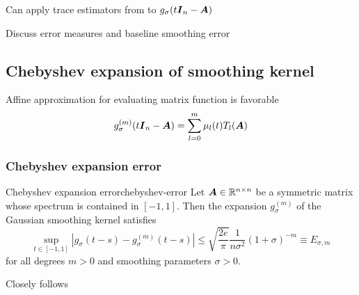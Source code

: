 \documentclass[12pt]{article}
\begin{document}
Can apply trace estimators from  to $g_{\sigma}(t\boldsymbol{I}_n - \boldsymbol{A})$

Discuss error measures and baseline smoothing error 

\subsection{Chebyshev expansion of smoothing kernel}
\label{subsec:chebyshev-expansion}

Affine approximation for evaluating matrix function is favorable
\begin{equation}
    g_{\sigma}^{(m)}(t\boldsymbol{I}_n - \boldsymbol{A}) = \sum_{l=0}^{m} \mu_l(t) T_l(\boldsymbol{A})
    \label{equ:matrix-expansion}
\end{equation}

\subsubsection{Chebyshev expansion error}
\label{subsubsec:expansion-error}

\begin{lemma}{Chebyshev expansion error}{chebyshev-error}
    Let $\boldsymbol{A} \in \mathbb{R}^{n \times n}$ be a symmetric matrix whose spectrum is contained in $[-1, 1]$. Then the expansion $g_{\sigma}^{(m)}$ of the Gaussian smoothing kernel satisfies
    \begin{equation}
        \sup_{t \in [-1, 1]} \left| g_{\sigma}(t - s) - g_{\sigma}^{(m)}(t - s) \right| \leq \sqrt{\frac{2e}{\pi}} \frac{1}{n \sigma^2} (1 + \sigma)^{-m} \equiv E_{\sigma, m}
        \label{equ:2-chebyshev-interpolation-sup-error-kernel}
    \end{equation}
    for all degrees $m > 0$ and smoothing parameters $\sigma>0$.
\end{lemma}

Closely follows \cite[Theorem 2]{lin-2017-randomized-estimation}
\end{document}
